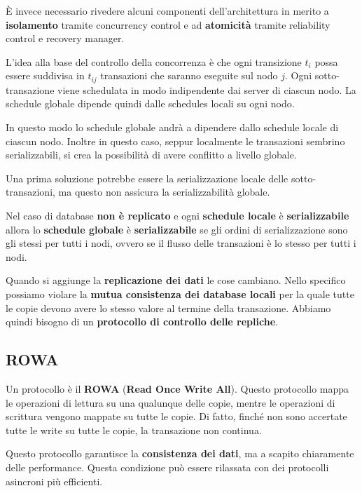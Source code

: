 È invece necessario rivedere alcuni componenti dell'architettura in merito a
\textbf{isolamento} tramite concurrency control e ad \textbf{atomicità} tramite
reliability control e recovery manager.

L'idea alla base del controllo della concorrenza è che ogni transizione $t_i$
possa essere suddivisa in $t_{ij}$ transazioni che saranno eseguite sul nodo $j$.
Ogni sotto-transazione viene schedulata in modo indipendente dai server di
ciascun nodo. La schedule globale dipende quindi dalle schedules locali su ogni nodo.

In questo modo lo schedule globale andrà a dipendere dallo schedule locale di
ciascun nodo. Inoltre in questo caso, seppur localmente le transazioni sembrino
serializzabili, si crea la possibilità di avere conflitto a livello globale.

Una prima soluzione potrebbe essere la serializzazione locale delle sotto-transazioni,
ma questo non assicura la serializzabilità globale.

Nel caso di database \textbf{non è replicato} e ogni \textbf{schedule locale} è
\textbf{serializzabile} allora lo  \textbf{schedule globale} è \textbf{serializzabile}
se gli ordini di serializzazione sono gli stessi per tutti i nodi, ovvero se il
flusso delle transazioni è lo stesso per tutti i nodi.

Quando si aggiunge la  \textbf{replicazione dei dati} le cose cambiano. Nello
specifico possiamo violare la \textbf{mutua consistenza dei database locali} per
la quale tutte le copie devono avere lo stesso valore al termine della transazione.
Abbiamo quindi bisogno di un \textbf{protocollo di controllo delle repliche}.
\subsection{ROWA}
Un protocollo è il \textbf{ROWA} (\textbf{Read Once Write All}). Questo
protocollo mappa le operazioni di lettura su una qualunque delle copie, mentre
le operazioni di scrittura vengono mappate su tutte le copie. Di fatto, finché
non sono accertate tutte le write su tutte le copie, la transazione non continua.

Questo protocollo garantisce la \textbf{consistenza dei dati}, ma a scapito
chiaramente delle performance. Questa condizione può essere rilassata con dei
protocolli asincroni più efficienti.

